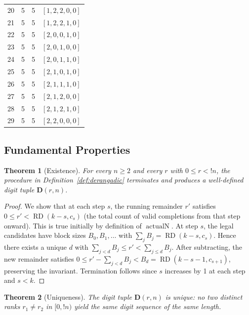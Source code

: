 \documentclass[11pt,a4paper]{article}
\newtheorem{theorem}{Theorem}[section]
\newcommand{\subfact}[1]{!{#1}} %
\newcommand{\rder}[2]{\operatorname{RD}(#1,#2)} %
\newcommand{\actualN}{\operatorname{actualN}}
\begin{document}
\begin{table}[h]
\begin{tabular}{cccl}
            20 & 5 & 5 & $[1, 2, 2, 0, 0]$ \\
            21 & 5 & 5 & $[1, 2, 2, 1, 0]$ \\
            22 & 5 & 5 & $[2, 0, 0, 1, 0]$ \\
            23 & 5 & 5 & $[2, 0, 1, 0, 0]$ \\
            24 & 5 & 5 & $[2, 0, 1, 1, 0]$ \\
            25 & 5 & 5 & $[2, 1, 0, 1, 0]$ \\
            26 & 5 & 5 & $[2, 1, 1, 1, 0]$ \\
            27 & 5 & 5 & $[2, 1, 2, 0, 0]$ \\
            28 & 5 & 5 & $[2, 1, 2, 1, 0]$ \\
            29 & 5 & 5 & $[2, 2, 0, 0, 0]$ \\
            \bottomrule
        \end{tabular}
    \end{table}

    \subsection{Fundamental Properties}

    \begin{theorem}[Existence]
        \label{thm:existence}
        For every $n \geq 2$ and every $r$ with $0 \leq r < \subfact{n}$, the
        procedure in Definition~\ref{def:derangadic} terminates and produces a
        well-defined digit tuple $\mathbf{D}(r,n)$.
    \end{theorem}

    \begin{proof}
        We show that at each step $s$, the running remainder $r'$ satisfies
        $0 \leq r' < \rder{k-s}{c_s}$ (the total count of valid completions from
        that step onward). This is true initially by definition of $\actualN$.
        At step $s$, the legal candidates have block sizes $B_0, B_1, \dots$ with
        $\sum_j B_j = \rder{k-s}{c_s}$. Hence there exists a unique $d$ with
        $\sum_{j<d} B_j \leq r' < \sum_{j \leq d} B_j$. After subtracting, the new
        remainder satisfies $0 \leq r' - \sum_{j<d} B_j < B_d = \rder{k-s-1}{c_{s+1}}$,
        preserving the invariant. Termination follows since $s$ increases by 1 at
        each step and $s < k$.
    \end{proof}

    \begin{theorem}[Uniqueness]
        \label{thm:uniqueness}
        The digit tuple $\mathbf{D}(r,n)$ is unique: no two distinct ranks
        $r_1 \neq r_2$ in $[0, \subfact{n})$ yield the same digit sequence of the
        same length.
    \end{theorem}
\end{document}
